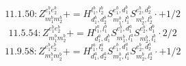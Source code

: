 \documentclass[letterpaper,10pt,fleqn,leqno,onecolumn]{article}
\begin{document}
\begin{equation} \;\;\;\;\;\;  11.1.50: Z^{e_{1}^{b}e_{2}^{b}}_{m_{1}^{b}m_{2}^{b}}+=H^{l_{1}^{b},l_{2}^{b}}_{d_{1}^{b},d_{2}^{b}}S^{e_{1}^{b},d_{1}^{b}}_{m_{1}^{b},l_{1}^{b}}S^{e_{2}^{b},d_{2}^{b}}_{m_{2}^{b},l_{2}^{b}}\cdot +1/2 \end{equation}
\begin{equation} \;\;\;\;\;\;  11.5.54: Z^{e_{1}^{b}e_{2}^{b}}_{m_{1}^{b}m_{2}^{b}}+=H^{l_{1}^{a},l_{1}^{b}}_{d_{1}^{a},d_{1}^{b}}S^{e_{1}^{b},d_{1}^{a}}_{m_{1}^{b},l_{1}^{a}}S^{e_{2}^{b},d_{1}^{b}}_{m_{2}^{b},l_{1}^{b}}\cdot 2/2 \end{equation}
\begin{equation} \;\;\;\;\;\;  11.9.58: Z^{e_{1}^{b}e_{2}^{b}}_{m_{1}^{b}m_{2}^{b}}+=H^{l_{1}^{a},l_{2}^{a}}_{d_{1}^{a},d_{2}^{a}}S^{e_{1}^{b},d_{1}^{a}}_{m_{1}^{b},l_{1}^{a}}S^{e_{2}^{b},d_{2}^{a}}_{m_{2}^{b},l_{2}^{a}}\cdot +1/2 \end{equation}
\end{document}

